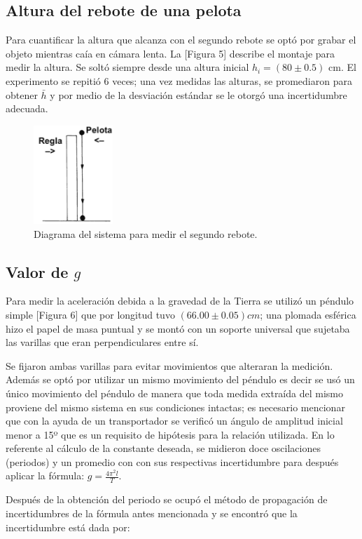 \documentclass{article}
\begin{document}
\subsection{Altura del rebote de una pelota}
Para cuantificar la altura que alcanza con el segundo rebote se optó por grabar el objeto mientras caía en cámara lenta. La [Figura 5] describe el montaje para medir la altura. Se soltó siempre desde una altura inicial $h_i = (80 \pm 0.5)$ cm. El experimento se repitió 6 veces; una vez medidas las alturas, se promediaron para obtener $\bar{h}$ y por medio de la desviación estándar se le otorgó una incertidumbre adecuada.

\begin{figure}[H]
    \centering
    \includegraphics[width=3cm]{tiro.png}%
    \caption{Diagrama del sistema para medir el segundo rebote.}%
\end{figure}

\subsection{Valor de $g$}
Para medir la aceleración debida a la gravedad de la Tierra se utilizó un péndulo simple [Figura 6] que por longitud tuvo $(66.00 \pm 0.05) cm$; una plomada esférica hizo el papel de masa puntual y se montó con un soporte universal que sujetaba las varillas que eran perpendiculares entre sí.

Se fijaron ambas varillas para evitar movimientos que alteraran la medición. Además se optó por utilizar un mismo movimiento del péndulo es decir se usó un único movimiento del péndulo de manera que toda medida extraída del mismo proviene del mismo sistema en sus condiciones intactas; es necesario mencionar que con la ayuda de un transportador se verificó un ángulo de amplitud inicial menor a 15º que es un requisito de hipótesis para la relación utilizada. En lo referente al cálculo de la constante deseada, se midieron doce oscilaciones (periodos) y un promedio con con sus respectivas incertidumbre  para después aplicar la fórmula: $g = \frac{4\pi^2l}{T}$.

Después de la obtención del periodo se ocupó el método de propagación de incertidumbres de la fórmula antes mencionada y se encontró que la incertidumbre está dada por:
\end{document}
